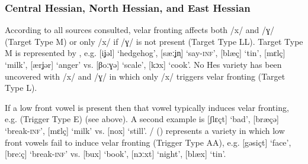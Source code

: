 \subsubsection{Central Hessian, North Hessian, and East Hessian}
According to all sources consulted, velar fronting affects both /x/ and /ɣ/ (Target Type M) or only /x/ if /ɣ/ is not present (Target Type LL). Target Type M is represented by , e.g. [iʝəl] ‘hedgehog’, [sæːʝn̩] ‘say{}-\textsc{inf}’, [blæç] ‘tin’, [mɛlç] ‘milk’, [ærʝər] ‘anger’ vs. [βoːɣə] ‘scale’, [kɔx] ‘cook’. No Hes variety has been uncovered with /x/ and /ɣ/ in which only /x/ triggers velar fronting (Target Type L). 

If a low front vowel is present then that vowel typically induces velar fronting, e.g. (Trigger Type E)  (see above). A second example is  [ʃlɛçt] ‘bad’, [bræçə] ‘break-\textsc{inf}’, [mɛlç] ‘milk’ vs. [nox] ‘still’. /  () represents a variety in which low front vowels fail to induce velar fronting (Trigger Type AA), e.g. [gəsiçt] ‘face’, [breːç] ‘break-\textsc{inf}’  vs. [bux] ‘book’, [nɔːxt] ‘night’, [blæx] ‘tin’.

